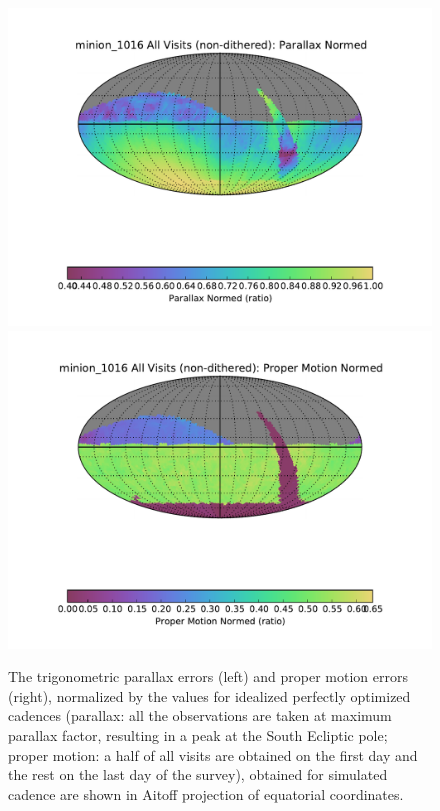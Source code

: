 \begin{figure}[t!]
\vskip -0.0in
\includegraphics[angle=0,width=0.49\hsize,clip]{figs/cadence/minion_1016_Parallax_Normed_All_Visits_non-dithered_HEAL_SkyMap.pdf}
\includegraphics[angle=0,width=0.49\hsize,clip]{figs/cadence/minion_1016_Proper_Motion_Normed_All_Visits_non-dithered_HEAL_SkyMap.pdf}
\vskip -0.1in
\caption{The trigonometric parallax errors (left) and proper motion errors (right), normalized
by the values for idealized perfectly optimized cadences (parallax: all the observations are taken
at maximum parallax factor, resulting in a peak at the South Ecliptic pole; proper motion:
a half of all visits are obtained on the first day and the rest on the last day of the survey),
obtained for simulated cadence  are shown in Aitoff projection of equatorial
coordinates.}
\label{fig:parapmenigma}
\end{figure}


